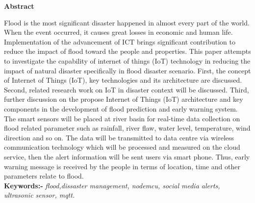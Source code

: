 \documentclass[a4paper,12pt]{report}
\begin{document}
\begin{center}
\noindent\LARGE \textbf{Abstract}
\end{center} 
\newline
Flood is the most significant disaster happened in
almost every part of the world. When the event occurred, it
causes great losses in economic and human life. Implementation
of the advancement of ICT brings significant contribution to
reduce the impact of flood toward the people and properties.
This paper attempts to investigate the capability of internet of
things (IoT) technology in reducing the impact of natural
disaster specifically in flood disaster scenario. First, the concept
of Internet of Things (IoT), key technologies and its architecture
are discussed. Second, related research work on IoT in disaster
context will be discussed. Third, further discussion on the
propose Internet of Things (IoT) architecture and key
components in the development of flood prediction and early
warning system. The smart sensors will be placed at river basin
for real-time data collection on flood related parameter such as
rainfall, river flaw, water level, temperature, wind direction and
so on. The data will be transmitted to data centre via wireless
communication technology which will be processed and
measured on the cloud service, then the alert information will be
sent users via smart phone. Thus, early warning message is
received by the people in terms of location, time and other
parameters relate to flood.\\
\textbf{Keywords:-} \textit {flood,dissaster management, nodemcu, social media alerts, ultrasonic sensor, mqtt.}



\noindent ~

\newpage
\vspace{2cm}

\tableofcontents




\noindent

\newpage
\listoffigures
\noindent

\noindent \textbf{}
\noindent








\noindent
\newpage

\large

\pagestyle{fancy}
\end{document}
